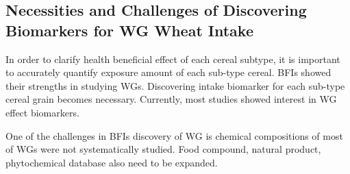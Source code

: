 \subsection{Necessities and Challenges of Discovering Biomarkers for WG Wheat Intake}
In order to clarify health beneficial effect of each cereal subtype, it is important to accurately quantify exposure amount of each sub-type cereal. BFIs showed their strengths in studying WGs. Discovering intake biomarker for each sub-type cereal grain becomes necessary. Currently, most studies showed interest in WG effect biomarkers.

One of the challenges in BFIs discovery of WG is chemical compositions of most of WGs were not systematically studied. 
Food compound, natural product, phytochemical database also need to be expanded.




